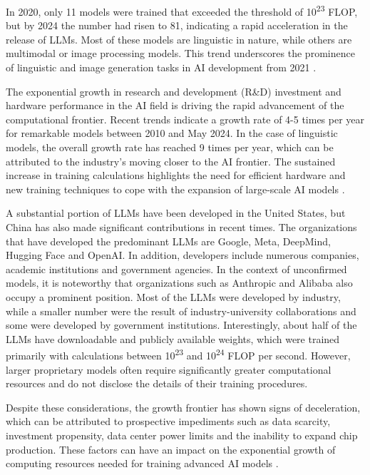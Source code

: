 In 2020, only 11 models were trained that exceeded the threshold of 10\textsuperscript{23} FLOP, but by 2024 the number had risen to 81, indicating a rapid acceleration in the release of LLMs. Most of these models are linguistic in nature, while others are multimodal or image processing models. This trend underscores the prominence of linguistic and image generation tasks in AI development from 2021 \cite{epoch2024trackinglargescaleaimodels}.

The exponential growth in research and development (R\&D) investment and hardware performance in the AI field is driving the rapid advancement of the computational frontier. Recent trends indicate a growth rate of 4-5 times per year for remarkable models between 2010 and May 2024. In the case of linguistic models, the overall growth rate has reached 9 times per year, which can be attributed to the industry's moving closer to the AI frontier. The sustained increase in training calculations highlights the need for efficient hardware and new training techniques to cope with the expansion of large-scale AI models \cite{epoch2024trainingcomputeoffrontieraimodelsgrowsby45xperyear}.

A substantial portion of LLMs have been developed in the United States, but China has also made significant contributions in recent times. The organizations that have developed the predominant LLMs are Google, Meta, DeepMind, Hugging Face and OpenAI. In addition, developers include numerous companies, academic institutions and government agencies. In the context of unconfirmed models, it is noteworthy that organizations such as Anthropic and Alibaba also occupy a prominent position. Most of the LLMs were developed by industry, while a smaller number were the result of industry-university collaborations and some were developed by government institutions. Interestingly, about half of the LLMs have downloadable and publicly available weights, which were trained primarily with calculations between 10\textsuperscript{23} and 10\textsuperscript{24} FLOP per second. However, larger proprietary models often require significantly greater computational resources and do not disclose the details of their training procedures.

Despite these considerations, the growth frontier has shown signs of deceleration, which can be attributed to prospective impediments such as data scarcity, investment propensity, data center power limits and the inability to expand chip production. These factors can have an impact on the exponential growth of computing resources needed for training advanced AI models \cite{epoch2024trainingcomputeoffrontieraimodelsgrowsby45xperyear}.

